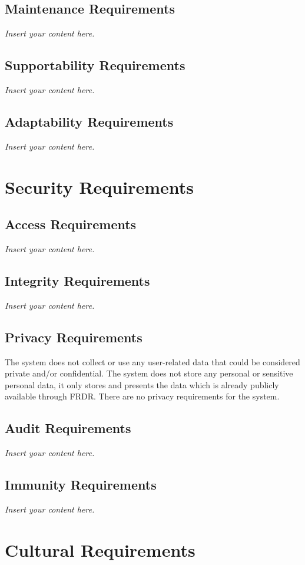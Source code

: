 \documentclass[12pt]{article}
\newcommand{\lips}{\textit{Insert your content here.}}
\begin{document}
\subsection{Maintenance Requirements}
\lips
\subsection{Supportability Requirements}
\lips
\subsection{Adaptability Requirements}
\lips

\section{Security Requirements}
\subsection{Access Requirements}
\lips
\subsection{Integrity Requirements}
\lips
\subsection{Privacy Requirements}

\par{The system does not collect or use any user-related data that could be considered private and/or confidential. \newline \indent
The system does not store any personal or sensitive personal data, it only stores and presents the data which is already 
publicly available through FRDR. \newline \indent There are no privacy requirements for the system.}

\subsection{Audit Requirements}
\lips
\subsection{Immunity Requirements}
\lips

\section{Cultural Requirements}
\end{document}
